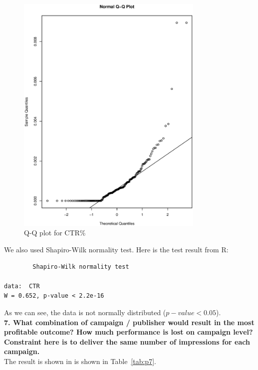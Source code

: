\documentclass[12pt]{article}
\begin{document}
\begin{figure}[tbh!]
  \centering
  \includegraphics[width=0.8\textwidth]{qq}
  \caption{Q-Q plot for CTR\% \label{fig:qq}}
\end{figure}

We also used Shapiro-Wilk normality test. Here is the test result from R:

\begin{verbatim}
        Shapiro-Wilk normality test

data:  CTR
W = 0.652, p-value < 2.2e-16
\end{verbatim}

As we can see, the data is not normally distributed ($p-value < 0.05$). \\

{\bf 7. What combination of campaign / publisher would result in the most profitable outcome? How much performance is lost on campaign level? Constraint here is to deliver the same number of impressions for each campaign.} \\

The result is shown in is shown in Table~\ref{tab:p7}. \\
\end{document}
